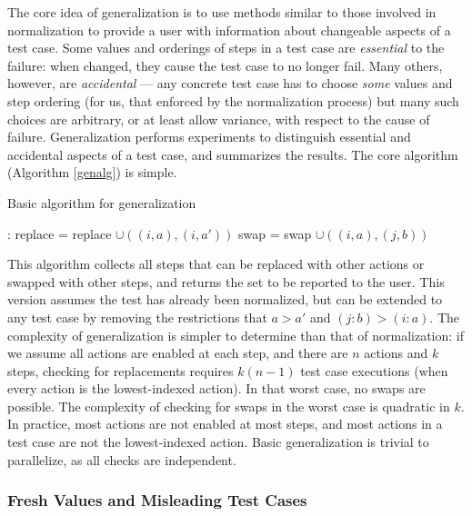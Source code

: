 The core idea of generalization is to use methods similar to those
involved in normalization to provide a user with information about
changeable aspects of a test case.  Some values and orderings of steps
in a test case are \emph{essential} to the failure: when changed, they
cause the test case to no longer fail.  Many others, however, are
\emph{accidental} --- any concrete test case has to choose \emph{some}
values and step ordering (for us, that enforced by the normalization
process) but many such choices are arbitrary, or at least allow
variance, with respect to the cause of failure.  Generalization
performs experiments to distinguish essential and accidental aspects
of a test case, and summarizes the results.  The core algorithm
(Algorithm \ref{genalg}) is simple.

\begin{algorithm}
\caption{Basic algorithm for generalization}
\label{genalg}
\begin{algorithmic}[1]
:
\State replace = replace $\cup ((i,a),(i,a'))$
\EndIf
\EndFor 
{}
\State swap = swap $\cup ((i,a),(j,b))$
\EndIf
\EndFor
\EndFor
{}
\end{algorithmic}
\end{algorithm}

This algorithm collects all steps that can be replaced with other
actions or swapped with other steps, and returns the set to be
reported to the user.  This version assumes the test has already been
normalized, but can be extended to any test case by removing the
restrictions that $a > a'$ and $(j : b) > (i : a)$.  The complexity of
generalization is simpler to determine than that of normalization: if
we assume all actions are enabled at each step, and there are $n$
actions and $k$ steps, checking for replacements requires $k (n-1)$
test case executions (when every action is the lowest-indexed action).
In that worst case, no swaps are possible.  The complexity of checking
for swaps in the worst case is quadratic in $k$.  In practice, most
actions are not enabled at most steps, and most actions in a test case
are not the lowest-indexed action.  Basic generalization is trivial to
parallelize, as all checks are independent.


\subsubsection{Fresh Values and Misleading Test Cases}
\label{freshgen}

